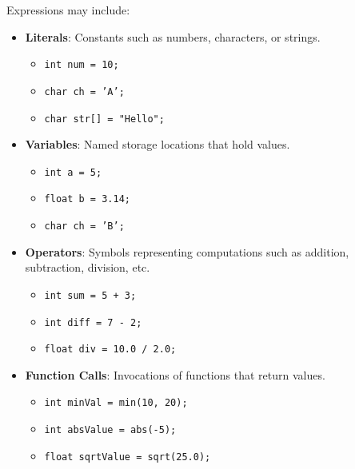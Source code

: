 \documentclass[11pt,A4]{article}
\begin{document}
        Expressions may include:
        \begin{itemize}
            \item \textbf{Literals}: Constants such as numbers, characters, or strings.
                \begin{itemize}
                    \item \texttt{int num = 10;}
                    \item \texttt{char ch = 'A';}
                    \item \texttt{char str[] = "Hello";}
                \end{itemize}
                
            \item \textbf{Variables}: Named storage locations that hold values.
                \begin{itemize}
                    \item \texttt{int a = 5;}
                    \item \texttt{float b = 3.14;}
                    \item \texttt{char ch = 'B';}
                \end{itemize}
                
            \item \textbf{Operators}: Symbols representing computations such as addition, subtraction, division, etc.
                \begin{itemize}
                    \item \texttt{int sum = 5 + 3;} 
                    \item \texttt{int diff = 7 - 2;}
                    \item \texttt{float div = 10.0 / 2.0;}
                \end{itemize}
                
            \item \textbf{Function Calls}: Invocations of functions that return values.
                \begin{itemize}
                    \item \texttt{int minVal = min(10, 20);}
                    \item \texttt{int absValue = abs(-5);}
                    \item \texttt{float sqrtValue = sqrt(25.0);}
                    
                \end{itemize}
        \end{itemize}
\end{document}
